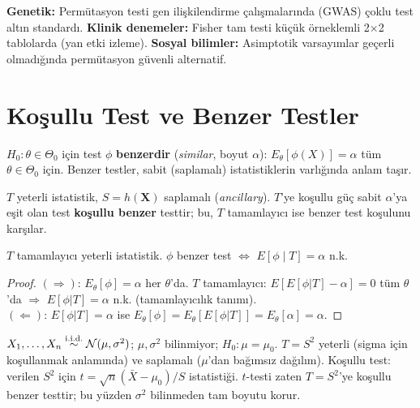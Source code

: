 \begin{disiplinlerarasibaglan}
\textbf{Genetik:} Permütasyon testi gen ilişkilendirme çalışmalarında (GWAS) çoklu test altın standardı. \textbf{Klinik denemeler:} Fisher tam testi küçük örneklemli 2×2 tablolarda (yan etki izleme). \textbf{Sosyal bilimler:} Asimptotik varsayımlar geçerli olmadığında permütasyon güvenli alternatif.
\end{disiplinlerarasibaglan}

\section{Koşullu Test ve Benzer Testler}
\label{sec:benzer_test}

\begin{tanim}\label{def:benzer_test}
$H_0:\theta\in\Theta_0$ için test $\phi$ \textbf{benzerdir} (\emph{similar}, boyut $\alpha$): $E_\theta[\phi(X)]=\alpha$ tüm $\theta\in\Theta_0$ için. Benzer testler, sabit (saplamalı) istatistiklerin varlığında anlam taşır.
\end{tanim}

\begin{tanim}\label{def:tamamlayici_benzer}
$T$ yeterli istatistik, $S=h(\mathbf{X})$ saplamalı (\emph{ancillary}). $T$'ye koşullu güç sabit $\alpha$'ya eşit olan test \textbf{koşullu benzer} testtir; bu, $T$ tamamlayıcı ise benzer test koşulunu karşılar.
\end{tanim}

\begin{teorem}\label{thm:benzer_karakter}
$T$ tamamlayıcı yeterli istatistik. $\phi$ benzer test $\iff$ $E[\phi\mid T]=\alpha$ n.k.
\end{teorem}

\begin{proof}[Proof]
$(\Rightarrow)$: $E_\theta[\phi]=\alpha$ her $\theta$'da. $T$ tamamlayıcı: $E[E[\phi|T]-\alpha]=0$ tüm $\theta$'da $\Rightarrow$ $E[\phi|T]=\alpha$ n.k. (tamamlayıcılık tanımı).\\
$(\Leftarrow)$: $E[\phi|T]=\alpha$ ise $E_\theta[\phi]=E_\theta[E[\phi|T]]=E_\theta[\alpha]=\alpha$.
\end{proof}

\begin{ornek}
$X_1,\ldots,X_n\overset{\text{i.i.d.}}{\sim}\mathcal{N}(\mu,\sigma^2)$; $\mu,\sigma^2$ bilinmiyor; $H_0:\mu=\mu_0$.
$T=S^2$ yeterli (sigma için koşullanmak anlamında) ve saplamalı ($\mu$'dan bağımsız dağılım). Koşullu test: verilen $S^2$ için $t=\sqrt{n}(\bar X-\mu_0)/S$ istatistiği. $t$-testi zaten $T=S^2$'ye koşullu benzer testtir; bu yüzden $\sigma^2$ bilinmeden tam boyutu korur.
\end{ornek}

